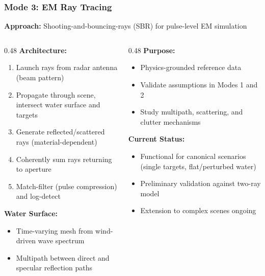 \documentclass[aspectratio=169, 10pt]{beamer}
\begin{document}
\begin{frame}
  \frametitle{Mode 3: EM Ray Tracing}
  \scriptsize
  \textbf{Approach:} Shooting-and-bouncing-rays (SBR) for pulse-level EM simulation
  \vspace{-0.1cm}

  \begin{columns}[T]
    \begin{column}{0.48\textwidth}
      \textbf{Architecture:}
      \begin{enumerate}\setlength{\itemsep}{0pt}\setlength{\topsep}{0pt}
        \item Launch rays from radar antenna (beam pattern)
        \item Propagate through scene, intersect water surface and targets
        \item Generate reflected/scattered rays (material-dependent)
        \item Coherently sum rays returning to aperture
        \item Match-filter (pulse compression) and log-detect
      \end{enumerate}

      \vspace{0.1cm}
      \textbf{Water Surface:}
      \begin{itemize}\setlength{\itemsep}{0pt}\setlength{\topsep}{0pt}
        \item Time-varying mesh from wind-driven wave spectrum
        \item Multipath between direct and specular reflection paths
      \end{itemize}
    \end{column}

    \begin{column}{0.48\textwidth}
      \textbf{Purpose:}
      \begin{itemize}\setlength{\itemsep}{0pt}\setlength{\topsep}{0pt}
        \item Physics-grounded reference data
        \item Validate assumptions in Modes 1 and 2
        \item Study multipath, scattering, and clutter mechanisms
      \end{itemize}

      \vspace{0.1cm}
      \textbf{Current Status:}
      \begin{itemize}\setlength{\itemsep}{0pt}\setlength{\topsep}{0pt}
        \item Functional for canonical scenarios (single targets, flat/perturbed water)
        \item Preliminary validation against two-ray model
        \item Extension to complex scenes ongoing
      \end{itemize}
    \end{column}
  \end{columns}
\end{frame}
\end{document}
